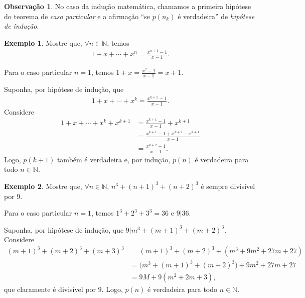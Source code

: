 \documentclass[a4paper,11pt,twoside, leqno]{article}
\theoremstyle{definition}
\newtheorem{remark}{Observação}[section]
\newtheorem*{example}{Exemplo}
\begin{document}
\begin{remark}
	No caso da indução matemática, chamamos a primeira hipótese do teorema de {\em caso particular} e a afirmação ``se $p(n_k)$ é verdadeira'' de {\em hipótese de indução}.
\end{remark}
\begin{example}
	Mostre que, $\forall n\in\mathbb{N}$, temos
	\begin{align*}
	1 + x + \cdots + x^n = \frac{x^{n+1} - 1}{x - 1}.
	\end{align*} 
	
	Para o caso particular $n=1$, temos $1 + x = \displaystyle{\frac{x^2 - 1}{x - 1} = x+1}$. 
	
	Suponha, por hipótese de indução, que 
	\begin{align*}
	1 + x + \cdots + x^k = \frac{x^{k+1} - 1}{x - 1}.
	\end{align*}
	Considere
	\begin{align*}
	1 + x + \cdots + x^k + x^{k+1} &= \frac{x^{k+1} - 1}{x - 1} + x^{k+1} \\
	&= \frac{ x^{k+1} - 1 + x^{k+2} - x^{k+1} }{x-1} \\
	&= \frac{x^{k+2} - 1}{x-1}.
	\end{align*}
	Logo, $p(k+1)$ também é verdadeira e, por indução, $p(n)$ é verdadeira para todo $n\in\mathbb{N}$.
\end{example}
\begin{example}
	Mostre que, $\forall n\in\mathbb{N}$, $n^3 + (n+1)^3 + (n+2)^3$ é sempre divisível por $9$.
	
	Para o caso particular $n=1$, temos $1^3 + 2^3 + 3^3 = 36$ e $9|36$.
	
	Suponha, por hipótese de indução, que $9|m^3 + (m+1)^3 + (m+2)^3$. Considere 
	\begin{align*}
	(m+1)^3 + (m+2)^3 + (m+3)^3 &= (m+1)^3 + (m+2)^3 + (m^3 + 9m^2 + 27m + 27) \\
	&= \big(m^3 + (m+1)^3 + (m+2)^3 \big) + 9m^2 + 27m + 27 \\
	&= 9M + 9(m^2+2m+3),
	\end{align*}
	que claramente é divisível por $9$. Logo, $p(n)$ é verdadeira para todo $n\in\mathbb{N}$.
\end{example}
\end{document}

